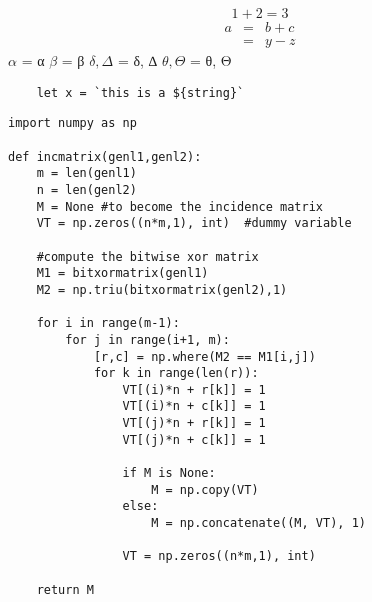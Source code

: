 \documentclass[a4paper,12pt]{article}
\begin{document}
\begin{equation}1+2=3\end{equation}
\begin{eqnarray}
  a & = & b + c \\
    & = & y - z
\end{eqnarray}
$\alpha$ = α
$\beta$ = β
$\delta, \Delta$ = δ, ∆
$\theta, \Theta$ = θ, Θ

\begin{comment}
This is a comment.
\end{comment}


\lstset{language=JavaScript}
\begin{lstlisting}
    let x = `this is a ${string}`
\end{lstlisting}

\begin{verbatim}
import numpy as np
 
def incmatrix(genl1,genl2):
    m = len(genl1)
    n = len(genl2)
    M = None #to become the incidence matrix
    VT = np.zeros((n*m,1), int)  #dummy variable
 
    #compute the bitwise xor matrix
    M1 = bitxormatrix(genl1)
    M2 = np.triu(bitxormatrix(genl2),1) 
 
    for i in range(m-1):
        for j in range(i+1, m):
            [r,c] = np.where(M2 == M1[i,j])
            for k in range(len(r)):
                VT[(i)*n + r[k]] = 1
                VT[(i)*n + c[k]] = 1
                VT[(j)*n + r[k]] = 1
                VT[(j)*n + c[k]] = 1
 
                if M is None:
                    M = np.copy(VT)
                else:
                    M = np.concatenate((M, VT), 1)
 
                VT = np.zeros((n*m,1), int)
 
    return M
\end{verbatim}
\end{document}
